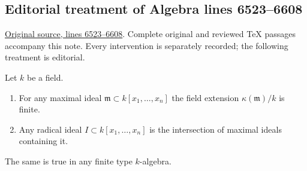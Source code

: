 \subsection{Editorial treatment of Algebra lines 6523--6608}

\hypertarget{algebra-context-054}{}

\noindent\href{https://github.com/stacks/stacks-project/blob/a04446e57ec1fbc252a871afcec7752fb2807b14/algebra.tex\#L6523}{Original source, lines 6523--6608}. Complete original and reviewed TeX passages accompany this note. Every intervention is separately recorded; the following treatment is editorial.


\begin{theorem}
\label{editorial-source-theorem-nullstellensatz}
Let $k$ be a field.
\begin{enumerate}
\item
\label{editorial-source-item-finite-kappa}
For any maximal ideal $\mathfrak m \subset k[x_1, \ldots, x_n]$
the field extension $\kappa(\mathfrak m)/k$ is finite.
\item
\label{editorial-source-item-polynomial-ring-Jacobson}
Any radical ideal $I \subset k[x_1, \ldots, x_n]$
is the intersection of maximal ideals containing it.
\end{enumerate}
The same is true in any finite type $k$-algebra.
\end{theorem}

